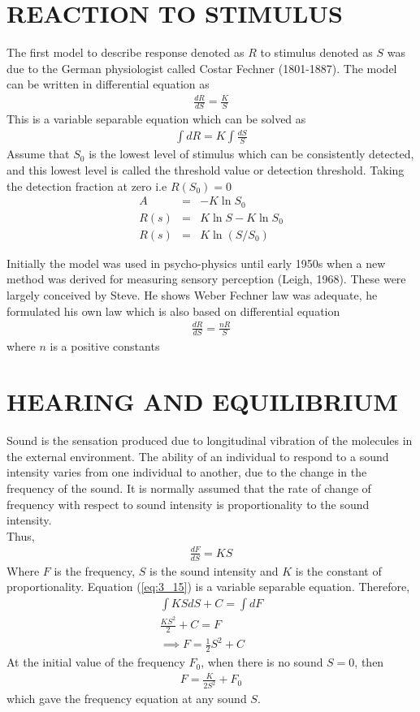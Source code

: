 \documentclass[11pt]{report}
\newcommand{\sps}{\\[0.2cm]}
\newcommand{\refn}[1]{(\ref{#1})}
\newcommand{\refx}[1]{\refn{eq:#1}}
\newcommand{\NI}{\noindent}
\begin{document}
	\section{REACTION TO STIMULUS}
	The first model to describe response denoted as $R$ to stimulus denoted as $S$ was due to the German physiologist called Costar Fechner (1801-1887). The model can be written in differential equation as 
	\begin{eqnarray}
		\frac{dR}{dS} = \frac{K}{S}\label{eq:3_13}
	\end{eqnarray}
	This is a variable separable equation which can be solved as
	\begin{eqnarray*}
		\int dR = K\int\frac{dS}{S}
	\end{eqnarray*}
	Assume that $S_0$ is the lowest level of stimulus which can be consistently detected, and this lowest level is called the threshold value or detection threshold. Taking the detection fraction at zero i.e $R(S_0)=0$
	\begin{eqnarray*}
		A &=& -K\ln S_0\sps
		R(s) &=& K\ln S - K\ln S_0\sps
		R(s) &=& K\ln(S/S_0)
	\end{eqnarray*}
	
	\NI Initially the model was used in psycho-physics until early 1950s when a new method was derived for measuring sensory perception (Leigh, 1968). These were largely conceived by Steve. He shows Weber Fechner law was adequate, he formulated his own law which is also based on differential equation
	\begin{eqnarray}
		\frac{dR}{dS} = \frac{nR}{S}
	\end{eqnarray}
	where $n$ is a positive constants
	
	\section{HEARING AND EQUILIBRIUM}
	Sound is the sensation produced due to longitudinal vibration of the molecules in the external environment. The ability of an individual to respond to a sound intensity varies from one individual to another, due to the change in the frequency of the sound. It is normally assumed that the rate of change of frequency with respect to sound intensity is proportionality to the sound intensity.\sps
	Thus,
	\begin{eqnarray}
		\frac{dF}{dS}=KS\label{eq:3_15}
	\end{eqnarray}
	Where $F$ is the frequency, $S$ is the sound intensity and $K$ is the constant of proportionality. Equation \refx{3_15} is a variable separable equation. Therefore,
	\begin{eqnarray*}
		\int KSdS + C = \int dF\sps
		\frac{KS^2}{2} + C = F\sps
		\implies F = \frac{1}{2}S^2 + C
	\end{eqnarray*}
	At the initial value of the frequency $F_0$, when there is no sound $S=0$, then
	\begin{eqnarray*}
		F = \frac{K}{2S^2} + F_0
	\end{eqnarray*}
	which gave the frequency equation at any sound $S$.
\end{document}
